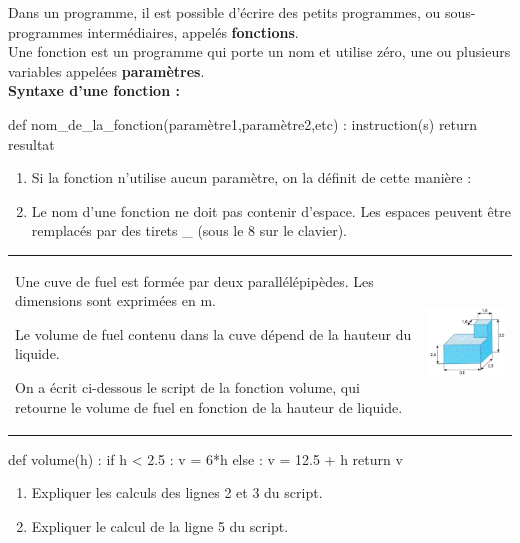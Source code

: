 \documentclass[a4paper,11pt,french]{article}
\begin{document}


Dans un programme, il est possible d'écrire des petits programmes, ou sous-programmes intermédiaires, appelés \textbf{fonctions}.\\
Une fonction est un programme qui porte un nom et utilise zéro, une ou plusieurs variables appelées \textbf{paramètres}.\\

\textbf{Syntaxe d'une fonction :}
\begin{pythoncode}
def nom_de_la_fonction(paramètre1,paramètre2,etc) :
   instruction(s)
   return resultat
\end{pythoncode}

\begin{remarque}[s]
	\begin{enumerate}[\textbullet]
		\item 	Si la fonction n’utilise aucun paramètre, on la définit de cette manière : 
		\item 	Le nom d’une fonction ne doit pas contenir d’espace. Les espaces peuvent être remplacés par des tirets \_ (sous le 8 sur le clavier).
	\end{enumerate}
\end{remarque}



\begin{tabular}{p{11cm}p{5cm}}
	\exo{}
	
	Une cuve de fuel est formée par deux parallélépipèdes. Les dimensions sont exprimées en m.
	
	Le volume de fuel contenu dans la cuve dépend de la hauteur du liquide.
	
	On a écrit ci-dessous le script de la fonction volume, qui retourne le volume de fuel en fonction de la hauteur de liquide.
	& \begin{center}
		\includegraphics[width=4.5cm]{cuve}
	\end{center}
\end{tabular}

\begin{minipage}{6cm}
	\begin{pythoncode}
def volume(h) :
   if h < 2.5 :
      v = 6*h
   else :
      v = 12.5 + h
   return v
	\end{pythoncode}
\end{minipage}
\begin{minipage}{10cm}
	\begin{enumerate}[\bfseries 1.]
		\item 	Expliquer les calculs des lignes 2 et 3 du script.
		\item 	Expliquer le calcul de la ligne 5 du script.	
	\end{enumerate}
\end{minipage}
\end{document}
